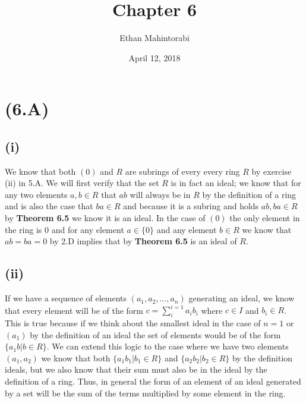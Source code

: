 \documentclass{article}
\begin{document}
  
  \title{Chapter 6}
  \author{Ethan Mahintorabi}
  \date{April 12, 2018}
  
  \maketitle

  \section*{(6.A)}
    \subsection*{(i)}
      We know that both $(0)$ and $R$ are subrings of every every ring $R$ by exercise (ii) in 5.A. We will first verify that the set $R$ is in fact an ideal; we know that for any two elements $a,b \in R$ that $ab$ will always be in $R$ by the definition of a ring and is also the case that $ba \in R$ and because it is a subring and holds $ab, ba \in R$ by \textbf{Theorem 6.5} we know it is an ideal. In the case of $(0)$ the only element in the ring is $0$ and for any element $a \in \{0\}$ and any element $b \in R$ we know that $ab = ba = 0$ by 2.D implies that by \textbf{Theorem 6.5} is an ideal of $R$.

    \subsection*{(ii)}
      If we have a sequence of elements $(a_1, a_2, \dots, a_n)$ generating an ideal, we know that every element will be of the form $c = \sum_{i}^{i=1} a_ib_i$ where $c \in I$ and $b_i \in R$. This is true because if we think about the smallest ideal in the case of $n=1$ or $(a_1)$ by the definition of an ideal the set of elements would be of the form $\{a_1b | b \in R\}$. We can extend this logic to the case where we have two elements $(a_1, a_2)$ we know that both $\{a_1b_1 | b_1 \in R\}$ and $\{a_2b_2 | b_2 \in R\}$ by the definition ideals, but we also know that their sum must also be in the ideal by the definition of a ring. Thus, in general the form of an element of an ideal generated by a set will be the sum of the terms multiplied by some element in the ring.
\end{document}
